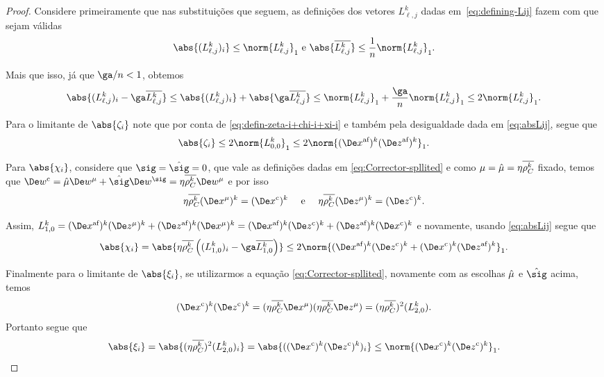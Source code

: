 \begin{proof}
Considere primeiramente que nas substituições que seguem, as definições dos vetores $L_{\ell,j}^{k}$ dadas em~\eqref{eq:defining-Lij} fazem com que sejam válidas 
\begin{equation}
	\label{eq:normLij}
\abs{({L_{\ell,j}^{k}})_{i}} \leq \norm{L_{\ell,j}^{k}}_{1} \text{ e } \abs{\dbvec{L_{\ell,j}^{k}}} \leq \dfrac{1}{n}\norm{L_{\ell,j}^{k}}_{1}.
\end{equation}

Mais que isso, já que $\ga/n < 1$, obtemos
\begin{equation}\label{eq:absLij}
 	\abs{({L_{\ell,j}^{k}})_{i} - \ga\dbvec{L_{\ell,j}^{k}}} \leq  	\abs{({L_{\ell,j}^{k}})_{i}} + \abs{\ga\dbvec{L_{\ell,j}^{k}}} \leq  \norm{L_{\ell,j}^{k}}_{1}+ \frac{\ga}{n}\norm{L_{\ell,j}^{k}}_{1} \leq 2 \norm{L_{\ell,j}^{k}}_{1}.
 \end{equation} 

Para o limitante de $\abs{\zeta_{i}}$ note que por conta de \eqref{eq:defin-zeta-i+chi-i+xi-i} e também pela desigualdade dada em \eqref{eq:absLij}, segue que 
\begin{equation}
\abs{\zeta_i}    \leq 2\norm{L_{0,0}^{k}}_1 \label{eq:bound-zeta-i} \leq 2\norm{ \dekx  \dekz }_1.   %
\end{equation}

Para $\abs{\chi_{i}}$, considere que   $\sig = \nextsig=0$, que vale as definições dadas em \eqref{eq:Corrector-spllited} e como  $\mu=\hat{\mu} = \eta\overline{\rho_C^{k}}$ fixado, temos que $\Decow = \nextmu \Dew^{\mu} + \nextsig
\Dew^{\sig} = \eta\rhoCkb \Dew^\mu $ e por isso 
	\[
		 \eta\rhoCkb (\Dex^\mu)^{k} = \Dekcox     \quad \text{ e } \quad    \eta\rhoCkb (\Dez^\mu)^{k} = \Dekcoz .
	\]

	Assim, $ L_{1,0}^{k} = \dekx(\Dez^\mu)^{k} +
			\dekz(\Dex^\mu)^{k} = \dekx\Dekcoz +
			\dekz\Dekcox $ e novamente, usando  \eqref{eq:absLij} segue que
\begin{equation}\label{eq:bound-chi-i}
	\abs{\chi_i } = \abs{\eta\rhoCkb  \left( ({L_{1,0}^{k}})_i - \ga\dbvec{L_{1,0}^{k}} \right)}  \leq 2 \norm{ \dekx \Dekcoz + \Dekcox \dekz }_1. %
\end{equation}

Finalmente para o limitante de $\abs{\xi_{i}}$, se utilizarmos  a equação \eqref{eq:Corrector-spllited}, novamente com as escolhas $\hat{\mu} $ e $\nextsig$ acima, temos
\[
	\Dekcox\Dekcoz = (\eta\rhoCkb \Dex^\mu)(\eta\rhoCkb \Dez^\mu) = (\eta\rhoCkb )^2(L_{2,0}^{k}).
\]
Portanto segue que
\begin{equation}\label{eq:bound-xi-i}
	\abs{\xi_i}	 =  \abs{(\eta\rhoCkb )^2(L_{2,0}^{k})_i}  = \abs{(\Dekcox\Dekcoz)_i} \leq \norm{\Dekcox\Dekcoz}_1.%
\end{equation}
	



\end{proof}
